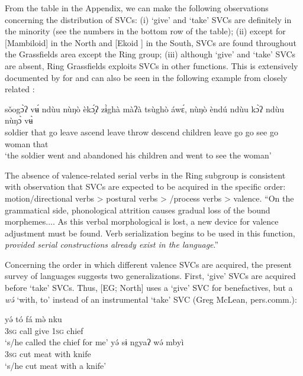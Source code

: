 \documentclass[output=paper]{langsci/langscibook}
\begin{document}
  From the table in the Appendix, we can make the following observations concerning the distribution of SVCs: (i) ‘give’ and ‘take’ SVCs are definitely in the minority (see the numbers in the bottom row of the table); (ii) except for  [Mambiloid] in the North and  [Ekoid ] in the South, SVCs are found throughout the Grassfields area except the Ring group; (iii) although ‘give’ and ‘take’ SVCs are absent, Ring Grassfields  exploits SVCs in other functions. This is extensively documented by \citet{Kießling2011}  for  and can also be seen in the following example from closely related  \citep[204]{Hyman1979}:

\ea
\label{ex:hyman:27}
\gll sǒog\`ɔʔ  v\'ʉ  ndùu nùŋò  èk\'ɔ̞ʔ  z\`ɨghà  màʔà  tsùghò  áw\'ɛ,  nùŋò  èndú  ndùu k\`ɔʔ  ndùu nùŋ\`ɔ  v\`ʉ \\
soldier  that   go   leave ascend  leave  throw  descend children leave    go      go    see     go  woman that \\
\glt ‘the soldier went and abandoned his children and went to see the woman’
\z 

\noindent
The absence of valence-related serial verbs in the Ring subgroup is consistent with  observation that SVCs are expected to be acquired in the specific order: motion/directional verbs  {\textgreater}  postural verbs  {\textgreater}  /process verbs  {\textgreater}  valence.
 “On the grammatical side, phonological attrition causes gradual loss of the bound morphemes.... As this verbal morphological is lost, a new device for valence adjustment must be found. Verb serialization begins to be used in this function, \textit{provided serial constructions already exist in the language}.” \citep[51, my emphasis]{Foley1985}

Concerning the order in which different valence SVCs are acquired, the pres\-ent survey of  languages suggests two generalizations. First, ‘give’ SVCs are acquired before ‘take’ SVCs. Thus,  [EG; North] uses a ‘give’ SVC for benefactives, but a  \textit{w\'ə} ‘with, to’ instead of an instrumental ‘take’ SVC (Greg McLean, pers.comm.):

\ea
\label{ex:hyman:28}
\ea
\gll y\'ə   tó    fá  m\`ə  nku \\
\textsc{3sg} call give  \textsc{1sg}  chief\\
\glt ‘s/he called the chief for me’
\ex 
\gll y\'ə   sɨ  ngyaʔ  w\'ə  mbyì \\
\textsc{3sg} cut  meat   with  knife \\
\glt ‘s/he cut meat with a knife’
\z 
\z 
\end{document}
